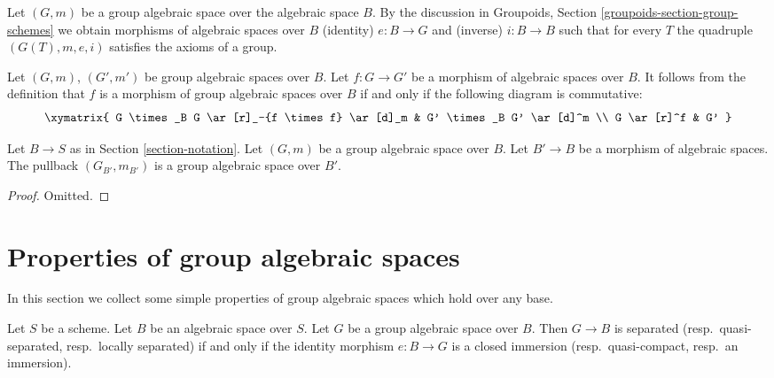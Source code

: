 \noindent
Let $(G, m)$ be a group algebraic space over the algebraic space $B$.
By the discussion in
Groupoids, Section \ref{groupoids-section-group-schemes}
we obtain morphisms of algebraic spaces over $B$
(identity) $e : B \to G$ and (inverse) $i : B \to B$ such that
for every $T$ the quadruple $(G(T), m, e, i)$ satisfies the
axioms of a group.

\medskip\noindent
Let $(G, m)$, $(G', m')$ be group algebraic spaces over $B$.
Let $f : G \to G'$ be a morphism of algebraic spaces over $B$.
It follows from the definition that $f$ is a morphism
of group algebraic spaces over $B$ if and only if the following diagram
is commutative:
$$
\xymatrix{
G \times_B G \ar[r]_-{f \times f} \ar[d]_m &
G' \times_B G' \ar[d]^m \\
G \ar[r]^f & G'
}
$$

\begin{lemma}
\label{lemma-base-change-group-space}
Let $B \to S$ as in Section \ref{section-notation}.
Let $(G, m)$ be a group algebraic space over $B$.
Let $B' \to B$ be a morphism of algebraic spaces.
The pullback $(G_{B'}, m_{B'})$ is a group algebraic space over $B'$.
\end{lemma}

\begin{proof}
Omitted.
\end{proof}








\section{Properties of group algebraic spaces}
\label{section-properties-group-spaces}

\noindent
In this section we collect some simple properties of group algebraic spaces
which hold over any base.

\begin{lemma}
\label{lemma-group-scheme-separated}
Let $S$ be a scheme. Let $B$ be an algebraic space over $S$.
Let $G$ be a group algebraic space over $B$.
Then $G \to B$ is separated (resp.\ quasi-separated, resp.\ locally separated)
if and only if the identity morphism $e : B \to G$ is a closed immersion
(resp.\ quasi-compact, resp.\ an immersion).
\end{lemma}

